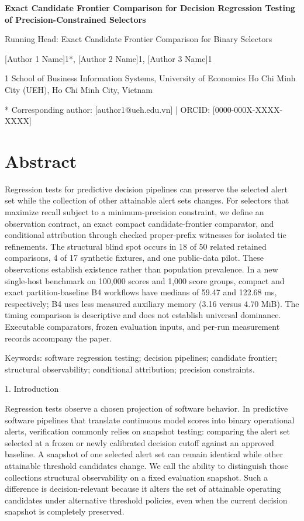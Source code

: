 \documentclass[11pt,a4paper]{article}
\begin{document}
\begin{center}\Large\bfseries Exact Candidate Frontier Comparison for Decision Regression Testing of Precision-Constrained Selectors\end{center}
Running Head: Exact Candidate Frontier Comparison for Binary Selectors

[Author 1 Name]1*, [Author 2 Name]1, [Author 3 Name]1

1 School of Business Information Systems, University of Economics Ho Chi Minh City (UEH), Ho Chi Minh City, Vietnam

* Corresponding author: [author1@ueh.edu.vn] | ORCID: [0000-000X-XXXX-XXXX]

\section*{Abstract}
Regression tests for predictive decision pipelines can preserve the selected alert set while the collection of other attainable alert sets changes. For selectors that maximize recall subject to a minimum-precision constraint, we define an observation contract, an exact compact candidate-frontier comparator, and conditional attribution through checked proper-prefix witnesses for isolated tie refinements. The structural blind spot occurs in 18 of 50 related retained comparisons, 4 of 17 synthetic fixtures, and one public-data pilot. These observations establish existence rather than population prevalence. In a new single-host benchmark on 100,000 scores and 1,000 score groups, compact and exact partition-baseline B4 workflows have medians of 59.47 and 122.68 ms, respectively; B4 uses less measured auxiliary memory (3.16 versus 4.70 MiB). The timing comparison is descriptive and does not establish universal dominance. Executable comparators, frozen evaluation inputs, and per-run measurement records accompany the paper.

Keywords: software regression testing; decision pipelines; candidate frontier; structural observability; conditional attribution; precision constraints.

1. Introduction

Regression tests observe a chosen projection of software behavior. In predictive software pipelines that translate continuous model scores into binary operational alerts, verification commonly relies on snapshot testing: comparing the alert set selected at a frozen or newly calibrated decision cutoff against an approved baseline. A snapshot of one selected alert set can remain identical while other attainable threshold candidates change. We call the ability to distinguish those collections structural observability on a fixed evaluation snapshot. Such a difference is decision-relevant because it alters the set of attainable operating candidates under alternative threshold policies, even when the current decision snapshot is completely preserved.
\end{document}
